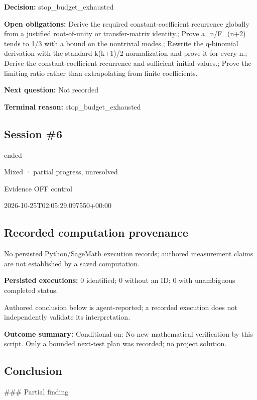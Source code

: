 \documentclass[11pt]{article}
\begin{document}
\textbf{Decision:} stop\_budget\_exhausted\par
\textbf{Open obligations:} Derive the required constant-coefficient recurrence globally from a justified root-of-unity or transfer-matrix identity.; Prove a\_n/F\_(n+2) tends to 1/3 with a bound on the nontrivial modes.; Rewrite the q-binomial derivation with the standard k(k+1)/2 normalization and prove it for every n.; Derive the constant-coefficient recurrence and sufficient initial values.; Prove the limiting ratio rather than extrapolating from finite coefficients.\par
\textbf{Next question:} Not recorded\par
\textbf{Terminal reason:} stop\_budget\_exhausted\par
\subsection{Session \#6}
\begin{description}[style=nextline,font=\normalfont\bfseries,leftmargin=0pt,labelsep=0pt]
\item[Execution status] ended
\item[Outcome] Mixed · partial progress, unresolved
\item[Strategy] Evidence OFF control
\item[Started] 2026-10-25T02:05:29.097550+00:00
\end{description}
\subsection{Recorded computation provenance}
No persisted Python/SageMath execution records; authored measurement claims are not established by a saved computation.\par
\textbf{Persisted executions:} 0 identified; 0 without an ID; 0 with unambiguous completed status.\par
Authored conclusion below is agent-reported; a recorded execution does not independently validate its interpretation.\par
\textbf{Outcome summary:} Conditional on: No new mathematical verification by this script. Only a bounded next-test plan was recorded; no project solution.\par
\subsection{Conclusion}
\#\#\# Partial finding
\end{document}

